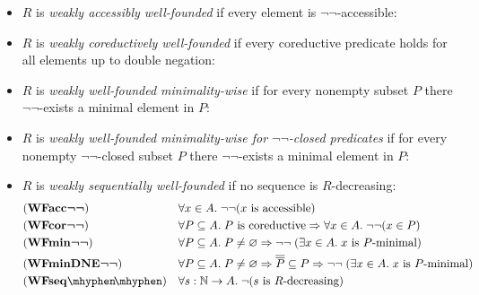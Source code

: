 \begin{definition} \label{def:WFweakproperties} \hfill
  \begin{itemize}
    \item $R$ is \emph{weakly accessibly well-founded} if every element is $\lnot\lnot$-accessible: %
    \item $R$ is \emph{weakly coreductively well-founded} if every coreductive predicate holds for all elements up to double negation:
    \item  $R$ is \emph{weakly well-founded minimality-wise} if for every nonempty subset $P$ there $\lnot \lnot$-exists a minimal element in $P$:
    \item  $R$ is \emph{weakly well-founded minimality-wise for $\lnot \lnot$-closed predicates} if for every nonempty $\lnot \lnot$-closed subset $P$ there $\lnot \lnot$-exists a minimal element in $P$:
    \item $R$ is \emph{weakly sequentially well-founded} if no sequence is $R$-decreasing:
      \begin{align*}
       &(\WFaccm) &&\forall x \in A.\; \lnot \lnot  (x \text{ is accessible}) \\
       &(\WFcorm)  &&\forall P \subseteq A.\;\text{$P$ is coreductive} \Rightarrow \forall x \in A.\; \lnot\lnot(x \in P)\\
       &(\WFminm) &&\forall P \subseteq A.\; P \neq \varnothing \Rightarrow \lnot \lnot \;
        (\exists x \in A.\; \text{$x$ is $P$-minimal})\\
       &(\WFminDNEm) &&\forall P \subseteq A.\; P \neq \varnothing \Rightarrow \ol{\ol P} \subseteq P\Rightarrow \lnot \lnot \;
        (\exists x \in A.\; \text{$x$ is $P$-minimal})\\
       &(\WFseqm) &&\forall s:\nat \to A.\; \lnot \text{($s$ is $R$-decreasing)}
      \end{align*}
\end{itemize}
\end{definition}



